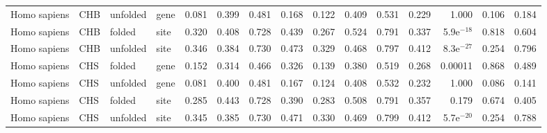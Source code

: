 \begin{longtable}{llllrrrrrrrrrrr}
        Homo sapiens &                       CHB &  unfolded &  gene &                              0.081 &                               0.399 &                 0.481 &                 0.168 &                              0.122 &                               0.409 &                 0.531 &                 0.229 &         1.000 &  0.106 &  0.184 \\
        Homo sapiens &                       CHB &    folded &  site &                              0.320 &                               0.408 &                 0.728 &                 0.439 &                              0.267 &                               0.524 &                 0.791 &                 0.337 &  5.9e$^{-18}$ &  0.818 &  0.604 \\
        Homo sapiens &                       CHB &  unfolded &  site &                              0.346 &                               0.384 &                 0.730 &                 0.473 &                              0.329 &                               0.468 &                 0.797 &                 0.412 &  8.3e$^{-27}$ &  0.254 &  0.796 \\
        Homo sapiens &                       CHS &    folded &  gene &                              0.152 &                               0.314 &                 0.466 &                 0.326 &                              0.139 &                               0.380 &                 0.519 &                 0.268 &       0.00011 &  0.868 &  0.489 \\
        Homo sapiens &                       CHS &  unfolded &  gene &                              0.081 &                               0.400 &                 0.481 &                 0.167 &                              0.124 &                               0.408 &                 0.532 &                 0.232 &         1.000 &  0.086 &  0.141 \\
        Homo sapiens &                       CHS &    folded &  site &                              0.285 &                               0.443 &                 0.728 &                 0.390 &                              0.283 &                               0.508 &                 0.791 &                 0.357 &         0.179 &  0.674 &  0.405 \\
        Homo sapiens &                       CHS &  unfolded &  site &                              0.345 &                               0.385 &                 0.730 &                 0.471 &                              0.330 &                               0.469 &                 0.799 &                 0.412 &  5.7e$^{-20}$ &  0.254 &  0.788 \\

\end{longtable}
